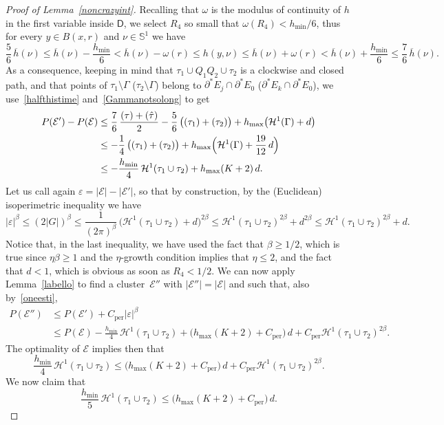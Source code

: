 \documentclass[JEP,XML,SOM,Unicode,NoFloatCountersInSection]{cedram}
\newcommand{\NoChangel}[1]{%
\expandafter\let\csname old\string#1\endcsname=#1
\let#1=\relax
\newcommand{#1}{\mathcode`l="716C\csname old\string#1\endcsname\mathcode`l="7160 }%
}
\renewcommand\S{\mathbb{S}}
\newcommand\Ceeb{C_\mathrm{per}}
\newcommand\len{\mathrm{len}}\NoChangel{\len}
\let\eps\varepsilon
\newcommand\E{\mathcal{E}}
\renewcommand\H{\mathcal{H}}
\theoremstyle{plain}
\theoremstyle{definition}
\begin{document}
\begin{proof}[Proof of Lemma~\ref{noncrazyint}]
Recalling that $\omega$ is the modulus of continuity of $h$ in the first variable inside $\mathsf{D}$, we select $R_4$ so small that $\omega(R_4)< h_{\min}/6$, thus for every $y\in B(x,r)$ and $\nu\in\S^1$ we have
\[
\frac 56\, \overline h(\nu) \leq \overline h(\nu)- \frac{h_{\min}}6<\overline h(\nu)- \omega(r) \leq h(y,\nu) \leq \overline h(\nu) + \omega(r)< \overline h(\nu) + \frac{h_{\min}}6 \leq \frac 76\,\overline h(\nu).
\]
As a consequence, keeping in mind that $\tau_1\cup Q_1Q_2\cup\tau_2$ is a clockwise and closed path, and that points of $\tau_1\setminus \Gamma$ (\resp $\tau_2\setminus\Gamma$) belong to $\partial^* E_j\cap\partial^* E_0$ (\resp $\partial^* E_k\cap \partial^* E_0$), we use~\eqref{halfthistime} and~\eqref{Gammanotsolong} to get
\begin{align}
P(\E')-P(\E)&\leq \frac 76\,\frac{\len(\tau)+\len(\hat\tau)}2 - \frac 56\, \big(\len(\tau_1) +\len(\tau_2)\big)+ h_{\max} \big(\H^1(\Gamma)+d\big)\notag\\
&\leq -\frac 14\, \big(\len(\tau_1) +\len(\tau_2)\big)+ h_{\max} \Bigl(\H^1(\Gamma)+\frac{19}{12}\,d\Bigr)\label{oneesti}\\
& \leq -\frac {h_{\min}}4\, \H^1(\tau_1\cup\tau_2) + h_{\max} (K+2)\,d.\notag
\end{align}
Let us call again $\eps=|\E|-|\E'|$, so that by construction, by the (Euclidean) isoperimetric inequality we have
\[
|\eps|^\beta \leq (2 |G|)^\beta \leq \frac 1{(2\pi)^\beta} \, \big(\H^1(\tau_1 \cup\tau_2)+d\big)^{2\beta}\leq
\H^1(\tau_1 \cup\tau_2)^{2\beta}+d^{2\beta}
\leq \H^1(\tau_1 \cup\tau_2)^{2\beta}+d.
\]
Notice that, in the last inequality, we have used the fact that $\beta\geq 1/2$, which is true since $\eta\beta\geq 1$ and the $\eta$-growth condition implies that $\eta\leq 2$, and the fact that $d<1$, which is obvious as soon as $R_4<1/2$. We can now apply Lemma~\ref{labello} to find a cluster~$\E''$ with $|\E''|=|\E|$ and such that, also by~\eqref{oneesti},
\[\begin{split}
P(\E'') &\leq P(\E') + \Ceeb |\eps|^\beta\\
&\leq P(\E) -\frac{h_{\min}}4\,\H^1(\tau_1 \cup\tau_2)+ \Big(h_{\max} (K+2)+ \Ceeb\Big)\,d + \Ceeb \H^1(\tau_1 \cup\tau_2)^{2\beta}.
\end{split}\]
The optimality of $\E$ implies then that
\[
\frac{h_{\min}}4\,\H^1(\tau_1 \cup\tau_2)\leq \Big(h_{\max} (K+2)+ \Ceeb\Big)\,d + \Ceeb \H^1(\tau_1 \cup\tau_2)^{2\beta}.
\]
We now claim that
\begin{equation}\label{sinceopt}
\frac{h_{\min}}5\,\H^1(\tau_1 \cup\tau_2)\leq \Big(h_{\max} (K+2)+ \Ceeb\Big)\,d.

\end{equation}
\end{proof}
\end{document}
